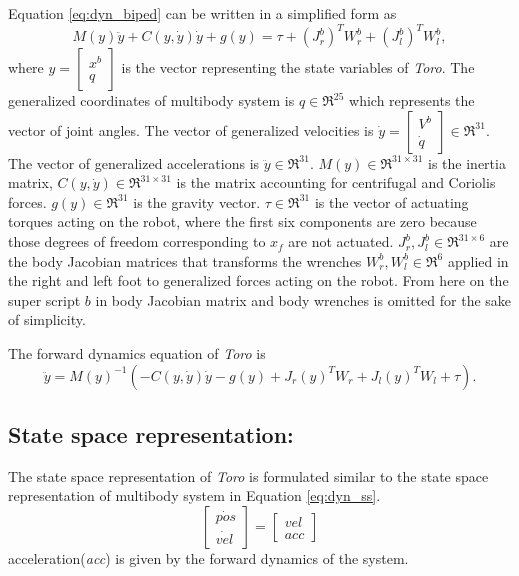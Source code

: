 Equation \ref{eq:dyn_biped} can be written in a simplified form as
\begin{equation} \label{eq:dyn_sbiped}
M(y)\ddot{y} + C(y,\dot{y})\dot{y} + g(y) = \tau + (J_r^b)^T W_r^b + (J_l^b)^T W_l^b,
\end{equation}
where $y = \begin{bmatrix} x^b \\ q \end{bmatrix}$ is the vector representing the state variables of \emph{Toro}. The generalized coordinates of multibody system is $q \in \Re^{25}$ which represents the vector of joint angles. The vector of generalized velocities is $\dot{y}=\begin{bmatrix} V^{b} \\ \dot{q} \end{bmatrix} \in \Re^{31}.$ The vector of generalized accelerations is $\ddot{y}\in \Re^{31}.$  $M(y)\in \Re^{31 \times 31}$ is the inertia matrix, $C(y,\dot{y})\in \Re^{31 \times 31}$ is the matrix accounting for centrifugal and Coriolis forces. $g(y) \in \Re^{31}$ is the gravity vector. $\tau \in \Re^{31}$ is the vector of actuating torques acting on the robot, where the first six components are zero because those degrees of freedom corresponding to $x_f$ are not actuated. $J_r^b,J_l^b \in \Re^{31 \times 6}$ are the body Jacobian matrices that transforms the wrenches $W_r^b,W_l^b \in \Re^{6}$ applied in the right and left foot to generalized forces acting on the robot. From here on the super script $b$ in body Jacobian matrix and body wrenches is omitted for the sake of simplicity.

The forward dynamics equation of \emph{Toro} is
\begin{equation}
	\label{eq:motion}
	\ddot{y} = M(y)^{-1}(-C(y,\dot{y})\dot{y} - g(y) + J_r(y)^{T}W_{r} +J_l(y)^{T}W_{l} + \tau). 
\end{equation}

\subsection{State space representation:}
The state space representation of \emph{Toro} is formulated similar to the state space representation of multibody system in Equation \ref{eq:dyn_ss}.
\begin{equation}
\label{eq:newton_motion}
 \begin{bmatrix}
\dot{pos} \\ \dot{vel}
\end{bmatrix}
= \begin{bmatrix}
vel \\ acc
\end{bmatrix}
\end{equation}
acceleration(\emph{acc}) is given by the forward dynamics of the system.

